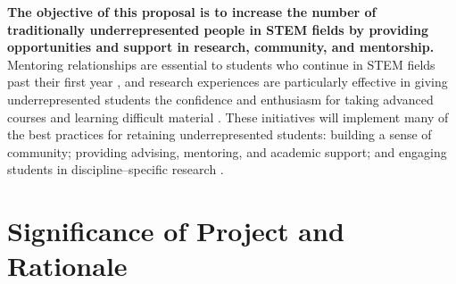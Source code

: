 \documentclass[12pt]{article}
\begin{document}
{\bf The objective of this proposal is to increase the number of traditionally underrepresented people in STEM fields by providing opportunities and support in research, community, and mentorship.} Mentoring relationships are essential to students who continue in STEM fields past their first year \citep{reureport,Nagda,Wilson}, and research experiences are particularly effective in giving underrepresented students the confidence and enthusiasm for taking advanced courses and learning difficult material \citep{armstrong03}.  These initiatives will implement many of the best practices for retaining underrepresented students:  building a sense of community; providing advising, mentoring, and academic support; and engaging students in discipline--specific research \citep{jordan,holland}. 	

\section{Significance of Project and Rationale}


\end{document}
